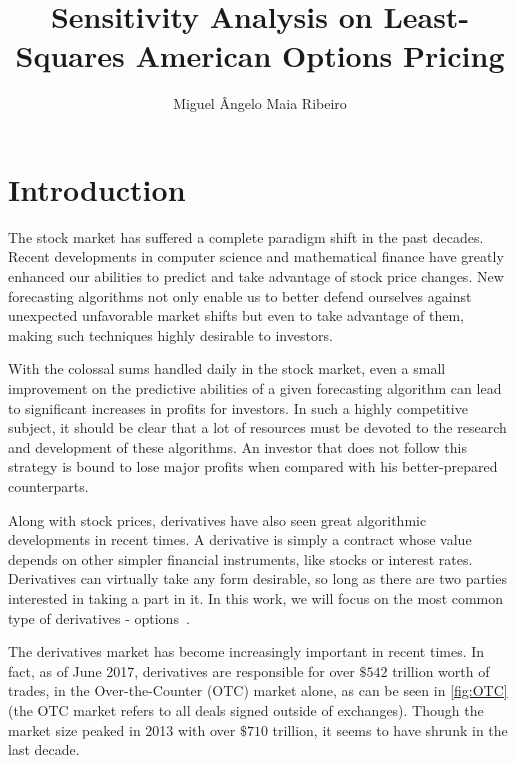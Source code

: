 \documentclass[a4paper,twocolumn,aps,prd,longbibliography,superscriptaddress]{revtex4-1}
\begin{document}
\title{Sensitivity Analysis on Least-Squares American Options Pricing}

\author{Miguel Ângelo Maia Ribeiro}




\maketitle
\section{Introduction}
The stock market has suffered a complete paradigm shift in the past decades. Recent developments in computer science and mathematical finance have greatly enhanced our abilities to predict and take advantage of stock price changes. New forecasting algorithms not only enable us to better defend ourselves against unexpected unfavorable market shifts but even to take advantage of them, making such techniques highly desirable to investors.

With the colossal sums handled daily in the stock market, even a small improvement on the predictive abilities of a given forecasting algorithm can lead to significant increases in profits for investors. In such a highly competitive subject, it should be clear that a lot of resources must be devoted to the research and development of these algorithms. An investor that does not follow this strategy is bound to lose major profits when compared with his better-prepared counterparts.




Along with stock prices, derivatives have also seen great algorithmic developments in recent times. A derivative is simply a contract whose value depends on other simpler financial instruments, like stocks or interest rates. Derivatives can virtually take any form desirable, so long as there are two parties interested in taking a part in it. In this work, we will focus on the most common type of derivatives - options~\cite{Hull}.

The derivatives market has become increasingly important in recent times. In fact, as of June 2017, derivatives are responsible for over $\$542$ trillion worth of trades, in the Over-the-Counter (OTC) market alone, as can be seen in \autoref{fig:OTC} (the OTC market refers to all deals signed outside of exchanges). Though the market size peaked in 2013 with over $\$710$ trillion, it seems to have shrunk in the last decade.
\end{document}
